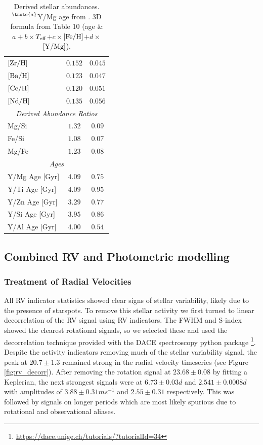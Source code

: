 \documentclass[fleqn,usenatbib]{mnras}
\newcommand{\teff}{$T_{\rm eff}$}
\newcommand{\feh}{\mbox{$\rm [Fe/H]$}}
\newcommand{\ymg}{\mbox{$\rm [Y/Mg]$}}
\newcommand{\Tperiod}{ $ 20.7 \pm 1.3 $ }
\begin{document}
\begin{table}
\begin{tabular}{lcc}
        $[\rm{Zr}/\rm{H}]$ & $   0.152 $ & $  0.045 $ \\
        $[\rm{Ba}/\rm{H}]$ & $   0.123 $ & $  0.047 $ \\
        $[\rm{Ce}/\rm{H}]$ & $   0.120 $ & $  0.051 $ \\
        $[\rm{Nd}/\rm{H}]$ & $   0.135 $ & $  0.056 $ \\
        \hline
        \multicolumn{3}{c}{\it Derived Abundance Ratios}\\
        Mg/Si & $   1.32 $ & $ 0.09 $ \\
        Fe/Si & $   1.08 $ & $ 0.07 $ \\
        Mg/Fe & $   1.23 $ & $ 0.08 $ \\
        \hline
        \multicolumn{3}{c}{\it Ages}\\
        Y/Mg Age [Gyr]  & $ 4.09 $ & $ 0.75 $ \\
        Y/Ti Age [Gyr]  & $ 4.09 $ & $ 0.95 $ \\
        Y/Zn Age [Gyr]  & $ 3.29 $ & $ 0.77 $ \\
        Y/Si Age [Gyr]  & $ 3.95 $ & $ 0.86 $ \\
        Y/Al Age [Gyr]  & $ 4.00 $ & $ 0.54 $ \\
        \hline
        \hline
    \end{tabular}
    \caption{Derived stellar abundances. $^{\tnote{a}}$Y/Mg age from \citet{Delgado-19}. 3D formula from Table 10 (age \&  $a + b \times$\teff{}$+ c \times$\feh{}$ + d \times$\ymg{}).}
    \label{tab:abunds}
\end{table}


\subsection{Combined RV and Photometric modelling}

\subsubsection{Treatment of Radial Velocities}
All RV indicator statistics showed clear signs of stellar variability, likely due to the presence of starspots.
To remove this stellar activity we first turned to linear decorrelation of the RV signal using RV indicators.
The FWHM and S-index showed the clearest rotational signals, so we selected these and used the decorrelation technique provided with the DACE spectroscopy python package \citep{2015ASPC..495....7B}\footnote{\url{https://dace.unige.ch/tutorials/?tutorialId=34}}.
Despite the activity indicators removing much of the stellar variability signal, the peak at \Tperiod{} remained strong in the radial velocity timeseries (see Figure \ref{fig:rv_decorr}).
After removing the rotation signal at $23.68\pm0.08$ by fitting a Keplerian, the next strongest signals were at $6.73\pm0.03d$ and $2.541\pm0.0008d$ with amplitudes of $3.88\pm0.31 ms^{-1}$ and $2.55\pm0.31$ respectively. This was followed by signals on longer periods which are most likely spurious due to rotational and observational aliases.
\end{document}
